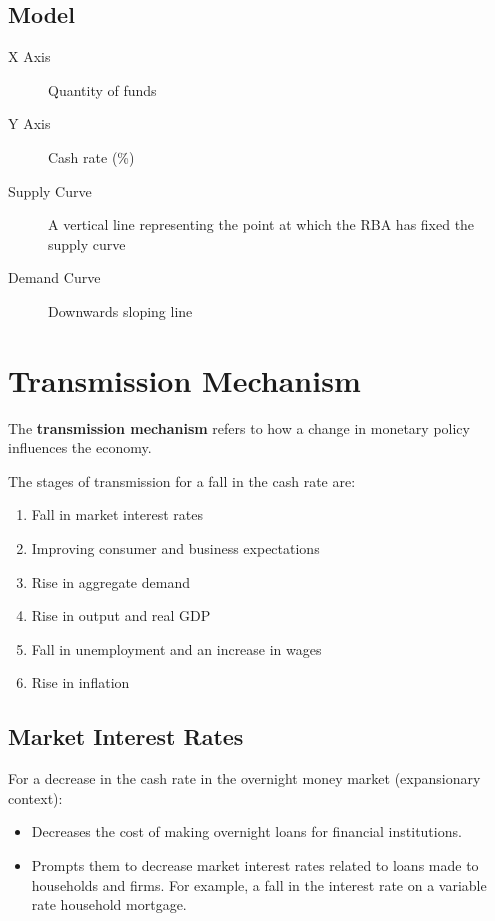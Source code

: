 \documentclass[a4paper,11pt]{report}
\begin{document}
\subsection{Model}


\begin{description}
\item [X Axis] Quantity of funds
\item [Y Axis] Cash rate (\%)
\item [Supply Curve] A vertical line representing the point at which the RBA has
	fixed the supply curve
\item [Demand Curve] Downwards sloping line
\end{description}


\section{Transmission Mechanism}

The \textbf{transmission mechanism} refers to how a change in monetary policy
influences the economy.

The stages of transmission for a fall in the cash rate are:

\begin{enumerate}
\item Fall in market interest rates
\item Improving consumer and business expectations
\item Rise in aggregate demand
\item Rise in output and real GDP
\item Fall in unemployment and an increase in wages
\item Rise in inflation
\end{enumerate}

\subsection{Market Interest Rates}

For a decrease in the cash rate in the overnight money market (expansionary
context):

\begin{itemize}
\item Decreases the cost of making overnight loans for financial institutions.
\item Prompts them to decrease market interest rates related to loans made to
	households and firms. For example, a fall in the interest rate on a variable
	rate household mortgage.
\end{itemize}
\end{document}
